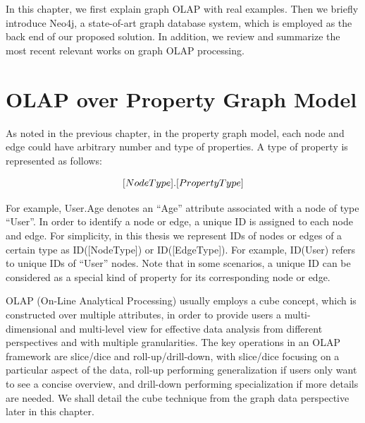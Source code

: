 In this chapter, we first explain graph OLAP with real examples. Then we briefly introduce Neo4j, a state-of-art graph database system, which is employed as the back end of our proposed solution. In addition, we review and summarize the most recent relevant works on graph OLAP processing.


\section{OLAP over Property Graph Model}


As noted in the previous chapter, in the property graph model, each node and edge could have arbitrary number and type of properties. A type of property is represented as follows:

\begin{displaymath}
\centering
[NodeType].[PropertyType]
\end{displaymath}

For example, User.Age denotes an ``Age'' attribute associated with a node of type ``User''. In order to identify a node or edge, a unique ID is assigned to each node and edge. For simplicity, in this thesis we represent IDs of nodes or edges of a certain type as ID([NodeType]) or ID([EdgeType]). For example, ID(User) refers to unique IDs of ``User'' nodes. Note that in some scenarios, a unique ID can be considered as a special kind of property for its corresponding node or edge.


OLAP (On-Line Analytical Processing) \cite{icde08_4497567,  vldb11_LiYZXL11, sigmod11_AgarwalC11} usually employs a cube concept, which is constructed over multiple attributes, in order to provide users a multi-dimensional and multi-level view for effective data analysis from different perspectives and with multiple granularities. The key operations in an OLAP framework are slice/dice and roll-up/drill-down, with slice/dice focusing on a particular aspect of the data, roll-up performing generalization if users only want to see a concise overview, and drill-down performing specialization if more details are needed. We shall detail the cube technique from the graph data perspective later in this chapter.



